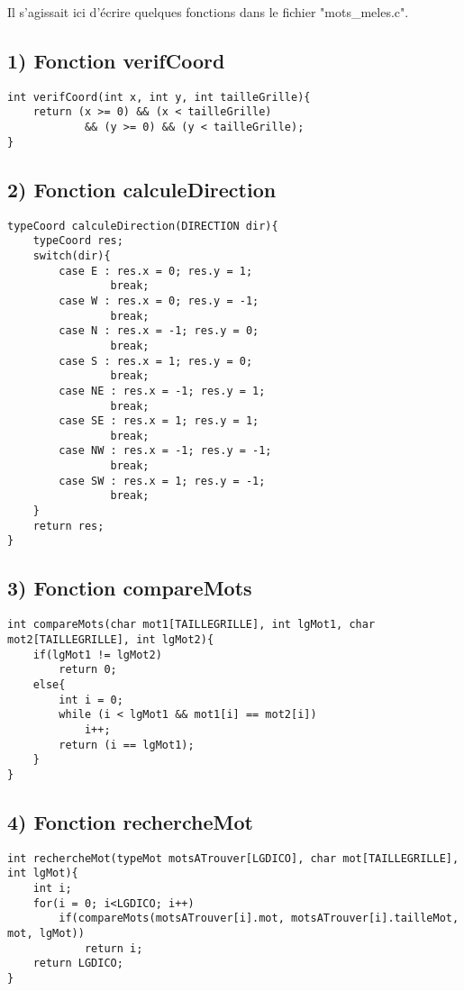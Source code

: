 \documentclass[a4paper,11pt]{article}
\begin{document}
Il s'agissait ici d'écrire quelques fonctions dans le fichier "mots\_meles.c".

\subsection*{1) Fonction verifCoord}
\begin{lstlisting}[caption=La fonction verifCoord]
int verifCoord(int x, int y, int tailleGrille){
	return (x >= 0) && (x < tailleGrille) 
	        && (y >= 0) && (y < tailleGrille);
}
\end{lstlisting}

\subsection*{2) Fonction calculeDirection}
\begin{lstlisting}[caption=La fonction calculeDirection]
typeCoord calculeDirection(DIRECTION dir){
	typeCoord res;
	switch(dir){
		case E : res.x = 0; res.y = 1;
				break;
		case W : res.x = 0; res.y = -1;
				break;
		case N : res.x = -1; res.y = 0;
				break;
		case S : res.x = 1; res.y = 0;
				break;
		case NE : res.x = -1; res.y = 1;
				break;
		case SE : res.x = 1; res.y = 1;
				break;
		case NW : res.x = -1; res.y = -1;
				break;
		case SW : res.x = 1; res.y = -1;
				break;
	}
	return res;
}
\end{lstlisting}

\newpage{}
\subsection*{3) Fonction compareMots}
\begin{lstlisting}[caption=La fonction compareMots]
int compareMots(char mot1[TAILLEGRILLE], int lgMot1, char mot2[TAILLEGRILLE], int lgMot2){
	if(lgMot1 != lgMot2)
		return 0;
	else{
		int i = 0;
		while (i < lgMot1 && mot1[i] == mot2[i])
			i++;
		return (i == lgMot1);
	}
}
\end{lstlisting}

\subsection*{4) Fonction rechercheMot}
\begin{lstlisting}[caption=La fonction rechercheMot]
int rechercheMot(typeMot motsATrouver[LGDICO], char mot[TAILLEGRILLE], int lgMot){
	int i;
	for(i = 0; i<LGDICO; i++)
		if(compareMots(motsATrouver[i].mot, motsATrouver[i].tailleMot, mot, lgMot))
			return i;
	return LGDICO;
}
\end{lstlisting}
\end{document}
